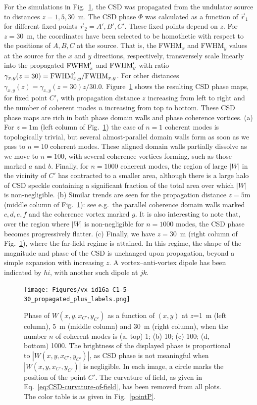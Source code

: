 \documentclass[%
 reprint,
 amsmath,amssymb,
 aps,
]{revtex4-1}
\begin{document}
For the simulations in Fig.~\ref{pointC_propagated}, the CSD was propagated from the undulator source to distances $z=1,5,30$~m. The CSD phase $\Phi$ was calculated as a function of $\vec{r}_1$ for different fixed points $\vec{r}_2=A',B',C'$. These fixed points depend on $z$. For $z=30$~m, the coordinates have been selected to be homothetic with respect to the positions of $A, B, C$ at the source. That is, the FWHM$_x$ and FWHM$_y$ values at the source for the $x$ and $y$ directions, respectively, transversely scale linearly into the propagated ${\rm FWHM}'_x$ and ${\rm FWHM}'_y$ with ratio $\gamma_{x,y}(z=30)={\rm FWHM}'_{x,y}/{\rm FWHM}_{x,y}$.
For other distances $\gamma_{x,y}(z)= \gamma_{x,y}(z=30) z / 30.0$. Figure~\ref{pointC_propagated} shows the resulting CSD phase maps, for fixed point $C'$, with propagation distance $z$ increasing from left to right and the number of coherent modes $n$ increasing from top to bottom. These CSD phase maps are rich in both phase domain walls and phase coherence vortices.  (a) For $z=1$m (left column of Fig.~\ref{pointC_propagated}) the case of $n=1$ coherent modes is topologically trivial, but several almost-parallel domain walls form as soon as we pass to $n=10$ coherent modes.  These aligned domain walls partially dissolve as we move to $n=100$, with several coherence vortices forming, such as those marked $a$ and $b$.  Finally, for $n=1000$ coherent modes, the region of large $|W|$ in the vicinity of $C'$ has contracted to a smaller area, although there is a large halo of CSD speckle containing a significant fraction of the total area over which $|W|$ is non-negligible. (b) Similar trends are seen for the propagation distance $z=5$m (middle column of Fig.~\ref{pointC_propagated}): see e.g.~the parallel coherence domain walls marked $c,d,e,f$ and the coherence vortex marked $g$.  It is also interesting to note that, over the region where $|W|$ is non-negligible for $n=1000$ modes, the CSD phase becomes progressively flatter.  (c) Finally, we have $z=30$~m (right column of Fig.~\ref{pointC_propagated}), where the far-field regime is attained. In this regime, the shape of the magnitude and phase of the CSD is unchanged upon propagation, beyond a simple expansion with increasing $z$. A  vortex--anti-vortex dipole has been indicated by $hi$, with another such dipole at $jk$. 

\begin{figure}
\texttt{[image: Figures/vx\_id16a\_C1-5-30\_propagated\_plus\_labels.png]}
\caption{Phase of $W(x,y,x_{C'},y_{C'})$ as a function of $(x,y)$ at $z$=1~m (left column), 5~m (middle column) and 30~m (right column), when the number $n$ of coherent modes is (a, top) 1; (b) 10; (c) 100; (d, bottom) 1000. The brightness of the displayed phase is proportional to $|W(x,y,x_{C'},y_{C'})|$, as CSD phase is not meaningful when $|W(x,y,x_{C'},y_{C'})|$ is negligible. In each image, a circle marks the position of the point $C'$. The curvature of field, as given in Eq.~\ref{eq:CSD-curvature-of-field}, has been removed from all plots.  The color table is as given in Fig.~\ref{pointP}.}
\label{pointC_propagated}%
\end{figure}
\end{document}
